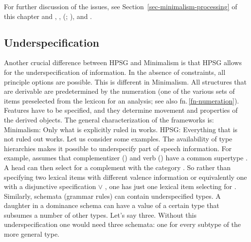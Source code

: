\documentclass[output=paper
 	        ,biblatex
                ,babelshorthands
                ,newtxmath
                ,draftmode
                ,colorlinks, citecolor=brown
]{langscibook}
\begin{document}
For further discussion of the issues, see Section~\ref{sec-minimalism-processing} of
this chapter and \eg \citet{PS2001a}, \citet{Postal2003a}, \citeauthor{SW2011a}
(\citeyear[Section~10.4.2]{SW2011a}; \citeyear[]{SW2015a}), and .  

\subsection{Underspecification}

Another crucial difference between HPSG and Minimalism is that HPSG allows for the underspecification of
information. In the absence of constraints, all principle options are possible. This is different in
Minimalism. All structures that are derivable are predetermined by the numeration (one of the
various sets of items preselected from the lexicon for an analysis; see also fn.\,\ref{fn-numeration}). Features have to
be specified, and they determine movement and properties of the derived objects. The general
characterization of the frameworks is: 
\eal
\ex Minimalism: Only what is explicitly ruled in works. 
\ex HPSG: Everything that is not ruled out works.
\zl
Let us consider some examples. 
The availability of type hierarchies makes it possible to underspecify part of speech
information. For example, \citet[]{Sag97a} assumes that complementizer () and verb
() have a common supertype . A head can then select for a complement with the category . So rather
than specifying two lexical items with different valence information or equivalently one with a disjunctive
specification  $\vee$ , one has just one lexical item selecting for
. Similarly, schemata (grammar rules) can contain underspecified types. A daughter in a
dominance schema can have a value of a certain type that subsumes a number of other
types. Let's say three. Without this underspecification one would need three schemata: one for every
subtype of the more general type.
\end{document}
